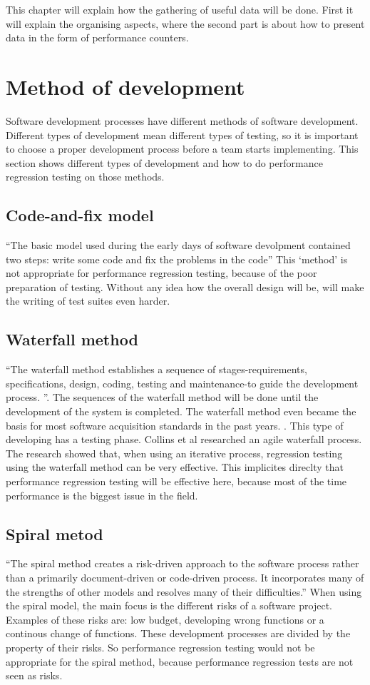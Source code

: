 This chapter will explain how the gathering of useful data will be done. First it will explain the organising aspects, where the second part is about how to present data in the form of performance counters.
\section{Method of development}
Software development processes have different methods of software development. Different types of development mean different types of testing, so it is important to choose a proper development process before a team starts implementing. This section shows different types of development and how to do performance regression testing on those methods.
\subsection{Code-and-fix model}
``The basic model used during the early days of software devolpment contained two steps: write some code and fix the problems in the code'' \cite{boehm1988spiral} This `method' is not appropriate for performance regression testing, because of the poor preparation of testing. Without any idea how the overall design will be, will make the writing of test suites even harder.

\subsection{Waterfall method}
``The waterfall method establishes a sequence of stages-requirements, specifications, design, coding, testing and maintenance-to guide the development process. ''\cite{kang1989software}. The sequences of the waterfall method will be done until the development of the system is completed. The waterfall method even became the basis for most software acquisition standards in the past years. \cite{boehm1988spiral}. This type of developing has a testing phase. Collins et al researched an agile waterfall process. \cite{collins2010iterative} The research showed that, when using an iterative process, regression testing using the waterfall method can be very effective. This implicites direclty that performance regression testing will be effective here, because most of the time performance is the biggest issue in the field. \cite{foo2010mining}
\subsection{Spiral metod}
``The spiral method creates a risk-driven approach to the software process rather than a primarily document-driven or code-driven process. It incorporates many of the strengths
of other models and resolves many of their
difficulties.''\cite{boehm1988spiral} When using the spiral model, the main focus is the different risks of a software project. Examples of these risks are: low budget, developing wrong functions or a continous change of functions. These development processes are divided by the property of their risks. So performance regression testing would not be appropriate for the spiral method, because performance regression tests are not seen as risks.  
